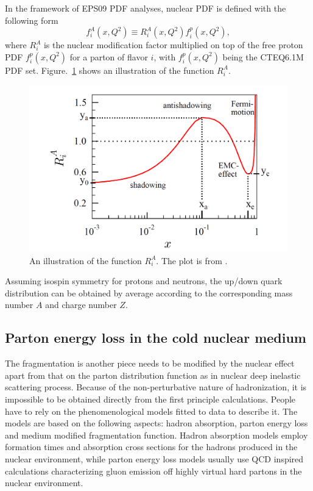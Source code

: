 In the framework of EPS09 PDF analyses, nuclear PDF is defined with the following form
\begin{equation}
f^{A}_{i}(x, Q^{2}) \equiv R^{A}_{i}(x, Q^{2})f^{p}_{i}(x, Q^{2}),
\end{equation} 
where $R^{A}_{i}$ is the nuclear modification factor multiplied on top of the
free proton PDF $f^{p}_{i}(x, Q^{2})$ for a parton of flavor $i$, 
with $f^{p}_{i}(x, Q^{2})$ being the CTEQ6.1M PDF set. Figure.~\ref{fig:shadowing} shows an illustration of the function $R^{A}_{i}$. 
\begin{figure}
\centering
\includegraphics[width=1.0\textwidth]{plots/chpt5/shadowing.png} 
\caption[The plot showing the ratio of gluon distribution function in the nuclear medium divided by the proton gluon distribution function] {
An illustration of the function $R^{A}_{i}$. The plot is from \cite{Eskola:2009uj}.}
\label{fig:shadowing}
\end{figure}


Assuming isospin symmetry for protons and neutrons, the up/down quark
distribution can be obtained by average according to the corresponding mass
number $A$ and charge number $Z$.


\subsection{Parton energy loss in the cold nuclear medium } \label{sec:energy_loss}
The fragmentation is another piece needs to be modified by the nuclear effect
apart from that on the parton distribution function as in nuclear deep inelastic
scattering process. Because of the non-perturbative nature of hadronization, it
is impossible to be obtained directly from the first principle calculations. People have
to rely on the phenomenological models fitted to data to describe it. The models
are based on the following aspects: hadron absorption, parton energy loss and medium
modified fragmentation function. Hadron absorption models employ formation
times and absorption cross sections for the hadrons produced in the nuclear
environment, while parton energy loss models usually use QCD inspired
calculations characterizing gluon emission off highly virtual hard partons in
the nuclear environment.

